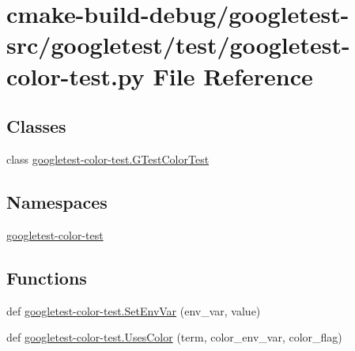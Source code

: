 \hypertarget{googletest-color-test_8py}{}\section{cmake-\/build-\/debug/googletest-\/src/googletest/test/googletest-\/color-\/test.py File Reference}
\label{googletest-color-test_8py}
\subsection*{Classes}
\begin{DoxyCompactItemize}
\item 
class \mbox{\hyperlink{classgoogletest-color-test_1_1GTestColorTest}{googletest-\/color-\/test.\+G\+Test\+Color\+Test}}
\end{DoxyCompactItemize}
\subsection*{Namespaces}
\begin{DoxyCompactItemize}
\item 
 \mbox{\hyperlink{namespacegoogletest-color-test}{googletest-\/color-\/test}}
\end{DoxyCompactItemize}
\subsection*{Functions}
\begin{DoxyCompactItemize}
\item 
def \mbox{\hyperlink{namespacegoogletest-color-test_a6892a0e83ce77517fa25534cc2c56210}{googletest-\/color-\/test.\+Set\+Env\+Var}} (env\+\_\+var, value)
\item 
def \mbox{\hyperlink{namespacegoogletest-color-test_a6b0f6528a3b277806378d1b0a7aa09bd}{googletest-\/color-\/test.\+Uses\+Color}} (term, color\+\_\+env\+\_\+var, color\+\_\+flag)
\end{DoxyCompactItemize}
